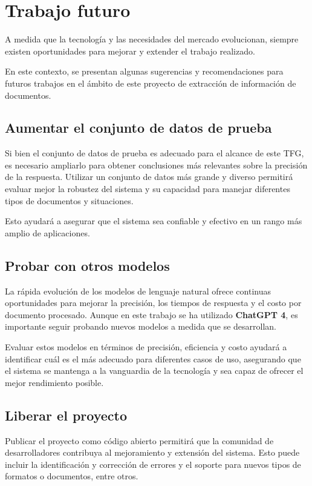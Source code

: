 \section{Trabajo futuro}

A medida que la tecnología y las necesidades del mercado evolucionan, siempre existen oportunidades para mejorar y
extender el trabajo realizado.

En este contexto, se presentan algunas sugerencias y recomendaciones para futuros trabajos en el ámbito de este proyecto
de extracción de información de documentos.

\subsection*{Aumentar el conjunto de datos de prueba}

Si bien el conjunto de datos de prueba es adecuado para el alcance de este TFG, es necesario ampliarlo para obtener
conclusiones más relevantes sobre la precisión de la respuesta.
Utilizar un conjunto de datos más grande y diverso permitirá evaluar mejor la robustez del sistema y su capacidad para
manejar diferentes tipos de documentos y situaciones.

Esto ayudará a asegurar que el sistema sea confiable y efectivo en un rango más amplio de aplicaciones.

\subsection*{Probar con otros modelos}

La rápida evolución de los modelos de lenguaje natural ofrece continuas oportunidades para mejorar la precisión, los
tiempos de respuesta y el costo por documento procesado.
Aunque en este trabajo se ha utilizado \textbf{ChatGPT 4}, es importante seguir probando nuevos modelos a medida que se
desarrollan.

Evaluar estos modelos en términos de precisión, eficiencia y costo ayudará a identificar cuál es el más adecuado para
diferentes casos de uso, asegurando que el sistema se mantenga a la vanguardia de la tecnología y sea capaz de ofrecer
el mejor rendimiento posible.


\subsection*{Liberar el proyecto}

Publicar el proyecto como código abierto permitirá que la comunidad de desarrolladores contribuya al mejoramiento y
extensión del sistema.
Esto puede incluir la identificación y corrección de errores y el soporte para nuevos tipos de formatos o documentos,
entre otros.

